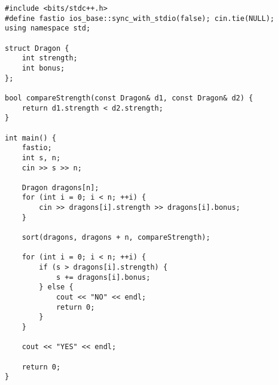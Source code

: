 \documentclass{article}
\begin{document}
\begin{lstlisting}
#include <bits/stdc++.h>
#define fastio ios_base::sync_with_stdio(false); cin.tie(NULL);
using namespace std;

struct Dragon {
    int strength;
    int bonus;
};

bool compareStrength(const Dragon& d1, const Dragon& d2) {
    return d1.strength < d2.strength;
}

int main() {
    fastio;
    int s, n;
    cin >> s >> n;

    Dragon dragons[n];
    for (int i = 0; i < n; ++i) {
        cin >> dragons[i].strength >> dragons[i].bonus;
    }

    sort(dragons, dragons + n, compareStrength);

    for (int i = 0; i < n; ++i) {
        if (s > dragons[i].strength) {
            s += dragons[i].bonus;
        } else {
            cout << "NO" << endl;
            return 0;
        }
    }

    cout << "YES" << endl;

    return 0;
}

\end{lstlisting}
\end{document}
